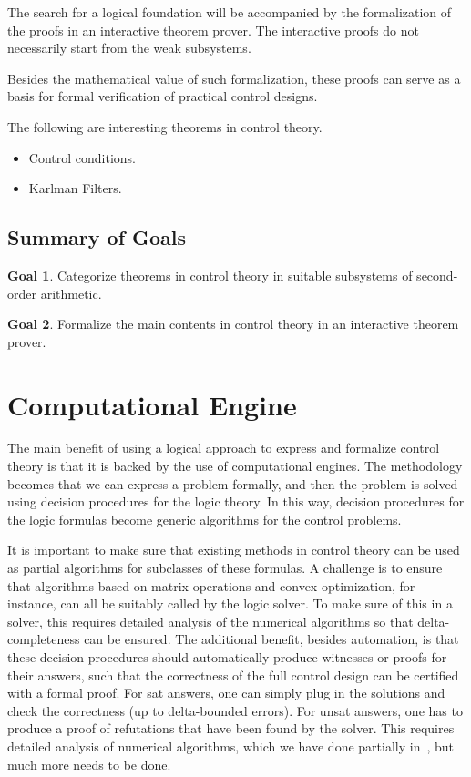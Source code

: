 \documentclass[10pt]{article}
\theoremstyle{definition}
\newtheorem{goal}{Goal}
\begin{document}
The search for a logical foundation will be accompanied by the formalization of the proofs in an interactive theorem prover. The interactive proofs do not necessarily start from the weak subsystems. 


Besides the mathematical value of such formalization, these proofs can serve as a basis for formal verification of practical control designs. 

The following are interesting theorems in control theory. 
\begin{itemize}
\item Control conditions. 
\item Karlman Filters. 
\end{itemize}

\subsection{Summary of Goals}

\begin{goal}
Categorize theorems in control theory in suitable subsystems of second-order arithmetic. 
\end{goal}
\begin{goal}
Formalize the main contents in control theory in an interactive theorem prover.  
\end{goal}


\newpage
\section{Computational Engine}

The main benefit of using a logical approach to express and formalize control theory is that it is backed by the use of computational engines. The methodology becomes that we can express a problem formally, and then the problem is solved using decision procedures for the logic theory. In this way, decision procedures for the logic formulas become generic algorithms for the control problems. 

It is important to make sure that existing methods in control theory can be used as partial algorithms for subclasses of these formulas. A challenge is to ensure that algorithms based on matrix operations and convex optimization, for instance, can all be suitably called by the logic solver. To make sure of this in a solver, this requires detailed analysis of the numerical algorithms so that delta-completeness can be ensured. The additional benefit, besides automation, is that these decision procedures should automatically produce witnesses or proofs for their answers, such that the correctness of the full control design can be certified with a formal proof. For sat answers, one can simply plug in the solutions and check the correctness (up to delta-bounded errors). For unsat answers, one has to produce a proof of refutations that have been found by the solver. This requires detailed analysis of numerical algorithms, which we have done partially in~\cite{}, but much more needs to be done. 
\end{document}
